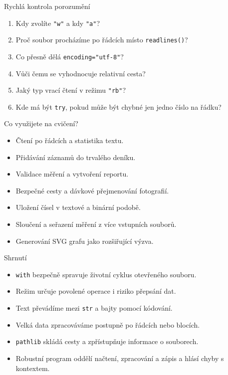 \documentclass[aspectratio=169]{beamer}
\begin{document}
\begin{frame}{Rychlá kontrola porozumění}
  \begin{enumerate}
    \item Kdy zvolíte \texttt{"w"} a kdy \texttt{"a"}?
    \item Proč soubor procházíme po řádcích místo \texttt{readlines()}?
    \item Co přesně dělá \texttt{encoding="utf-8"}?
    \item Vůči čemu se vyhodnocuje relativní cesta?
    \item Jaký typ vrací čtení v režimu \texttt{"rb"}?
    \item Kde má být \texttt{try}, pokud může být chybné jen jedno číslo na řádku?
  \end{enumerate}
\end{frame}

\begin{frame}{Co využijete na cvičení?}
  \begin{itemize}
    \item Čtení po řádcích a statistika textu.
    \item Přidávání záznamů do trvalého deníku.
    \item Validace měření a vytvoření reportu.
    \item Bezpečné cesty a dávkové přejmenování fotografií.
    \item Uložení čísel v textové a binární podobě.
    \item Sloučení a seřazení měření z více vstupních souborů.
    \item Generování SVG grafu jako rozšiřující výzva.
  \end{itemize}
\end{frame}

\begin{frame}{Shrnutí}
  \begin{itemize}
    \item \texttt{with} bezpečně spravuje životní cyklus otevřeného souboru.
    \item Režim určuje povolené operace i riziko přepsání dat.
    \item Text převádíme mezi \texttt{str} a bajty pomocí kódování.
    \item Velká data zpracováváme postupně po řádcích nebo blocích.
    \item \texttt{pathlib} skládá cesty a zpřístupňuje informace o souborech.
    \item Robustní program oddělí načtení, zpracování a zápis a hlásí chyby s kontextem.
  \end{itemize}
\end{frame}
\end{document}

